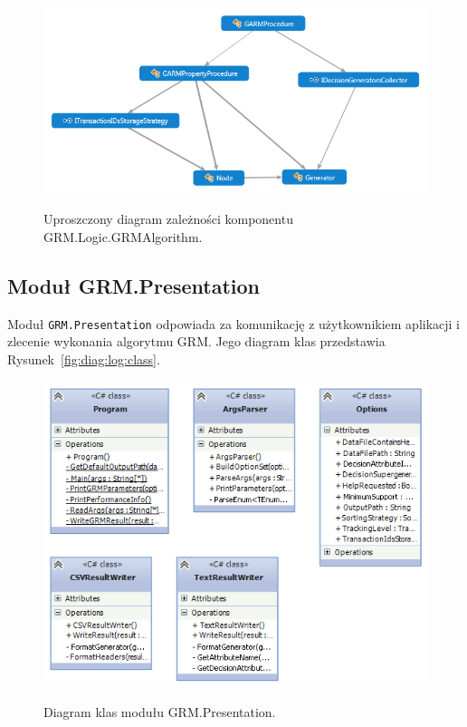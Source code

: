 \documentclass[a4paper,10pt]{article}
\begin{document}
  \begin{figure}[!ht]
   \begin{center}
    \scalebox{0.7}
    {
     \includegraphics{../diagrams/GRMAlgorithm_dependency_diagram.png}
    }
   \end{center}
   \caption{
    Uproszczony diagram zależności komponentu GRM.Logic.GRMAlgorithm.
   }
   \label{fig:diag:log:GRMAlgorithm}
  \end{figure}


 \subsection{Moduł GRM.Presentation}
 Moduł \verb+GRM.Presentation+ odpowiada za komunikację z użytkownikiem aplikacji i zlecenie wykonania algorytmu GRM.
 Jego diagram klas przedstawia Rysunek~\ref{fig:diag:log:class}.
 
 \begin{figure}[!ht]
  \begin{center}
   \scalebox{0.55}
   {
    \includegraphics{../diagrams/Presentation_class_diagram.png}
   }
  \end{center}
  \caption{
   Diagram klas modułu GRM.Presentation.
  }
  \label{fig:diag:pres:class}
 \end{figure}
 
\end{document}
